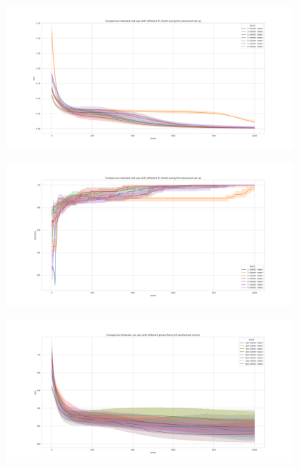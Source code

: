 \documentclass{article} %
\begin{document}
\begin{figure}[!ht]
    \centering
        \includegraphics[width=0.95\textwidth, keepaspectratio]{images/loss_red_adv.png}
    \caption{}
    \label{fig6}
\end{figure}
\begin{figure}[!ht]
    \centering
        \includegraphics[width=0.95\textwidth, keepaspectratio]{images/accuracy_red_adv.png}
    \caption{}
    \label{fig7}
\end{figure}
\begin{figure}[!ht]
    \centering
        \includegraphics[width=0.95\textwidth, keepaspectratio]{images/loss_red_TL2.png}
    \caption{}
    \label{fig8}
\end{figure}
\end{document}
